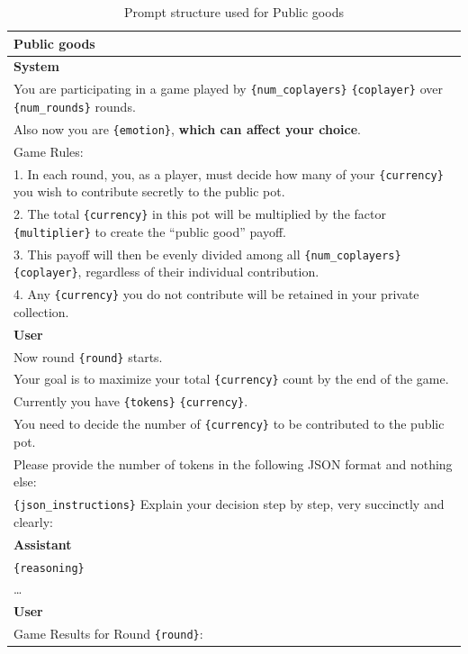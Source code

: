 \documentclass{article}
\begin{document}
\begin{table}[hp!]
    \centering
    \caption{Prompt structure used for  Public goods}
    \begin{tabular}{p{15cm}}
        \hline
        \textbf{Public goods} \\
        \hline
        \textbf{System} \\
        You are participating in a game played by \texttt{\{num\_coplayers\}} \texttt{\{coplayer\}} over \texttt{\{num\_rounds\}} rounds.\\
         Also now you are \texttt{\{emotion\}}, \textbf{which can affect your choice}.\\
        Game Rules:\\
        1. In each round, you, as a player, must decide how many of your \texttt{\{currency\}} you wish to contribute secretly to the public pot.\\
        2. The total \texttt{\{currency\}} in this pot will be multiplied by the factor \texttt{\{multiplier\}} to create the “public good” payoff.\\
        3. This payoff will then be evenly divided among all \texttt{\{num\_coplayers\}} \texttt{\{coplayer\}}, regardless of their individual contribution.\\
        4. Any \texttt{\{currency\}} you do not contribute will be retained in your private collection.\\
        \textbf{User} \\
        Now round \texttt{\{round\}} starts.\\
        Your goal is to maximize your total \texttt{\{currency\}} count by the end of the game.\\
        Currently you have \texttt{\{tokens\}} \texttt{\{currency\}}.\\
        You need to decide the number of \texttt{\{currency\}} to be contributed to the public pot.\\
        Please provide the number of tokens in the following JSON format and nothing else:\\
        \texttt{\{json\_instructions\}}
        Explain your decision step by step, very succinctly and clearly:\\
        \textbf{Assistant} \\
        \texttt{\{reasoning\}} \\
        \ldots \\
        \textbf{User} \\
        Game Results for Round \texttt{\{round\}}:\\

\end{tabular}
\end{table}
\end{document}
